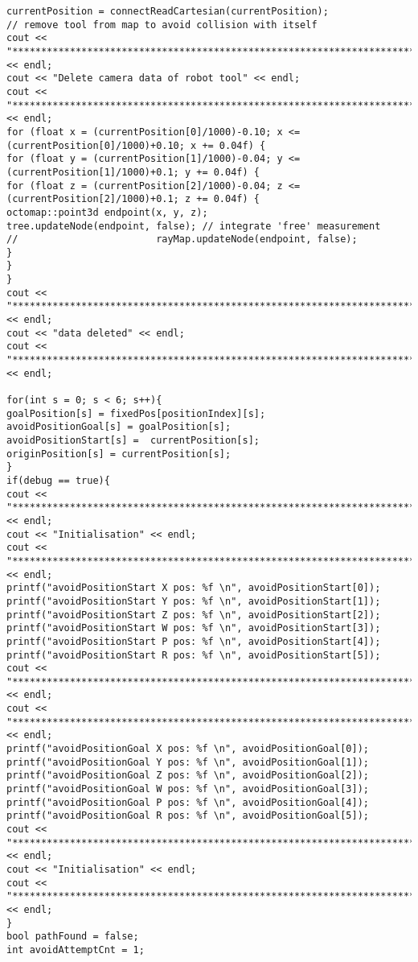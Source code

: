 \begin{lstlisting}[frame = single, label={lst:cppread1}]
currentPosition = connectReadCartesian(currentPosition);
// remove tool from map to avoid collision with itself
cout << "***********************************************************************" << endl;
cout << "Delete camera data of robot tool" << endl;
cout << "***********************************************************************" << endl;
for (float x = (currentPosition[0]/1000)-0.10; x <= (currentPosition[0]/1000)+0.10; x += 0.04f) {
for (float y = (currentPosition[1]/1000)-0.04; y <= (currentPosition[1]/1000)+0.1; y += 0.04f) {
for (float z = (currentPosition[2]/1000)-0.04; z <= (currentPosition[2]/1000)+0.1; z += 0.04f) {
octomap::point3d endpoint(x, y, z);
tree.updateNode(endpoint, false); // integrate 'free' measurement
//                        rayMap.updateNode(endpoint, false);
}
}
}
cout << "***********************************************************************" << endl;
cout << "data deleted" << endl;
cout << "***********************************************************************" << endl;

for(int s = 0; s < 6; s++){
goalPosition[s] = fixedPos[positionIndex][s];
avoidPositionGoal[s] = goalPosition[s];
avoidPositionStart[s] =  currentPosition[s];
originPosition[s] = currentPosition[s];
}
if(debug == true){
cout << "***********************************************************************" << endl;
cout << "Initialisation" << endl;
cout << "***********************************************************************" << endl;
printf("avoidPositionStart X pos: %f \n", avoidPositionStart[0]);
printf("avoidPositionStart Y pos: %f \n", avoidPositionStart[1]);
printf("avoidPositionStart Z pos: %f \n", avoidPositionStart[2]);
printf("avoidPositionStart W pos: %f \n", avoidPositionStart[3]);
printf("avoidPositionStart P pos: %f \n", avoidPositionStart[4]);
printf("avoidPositionStart R pos: %f \n", avoidPositionStart[5]);
cout << "***********************************************************************" << endl;
cout << "***********************************************************************" << endl;
printf("avoidPositionGoal X pos: %f \n", avoidPositionGoal[0]);
printf("avoidPositionGoal Y pos: %f \n", avoidPositionGoal[1]);
printf("avoidPositionGoal Z pos: %f \n", avoidPositionGoal[2]);
printf("avoidPositionGoal W pos: %f \n", avoidPositionGoal[3]);
printf("avoidPositionGoal P pos: %f \n", avoidPositionGoal[4]);
printf("avoidPositionGoal R pos: %f \n", avoidPositionGoal[5]);
cout << "***********************************************************************" << endl;
cout << "Initialisation" << endl;
cout << "***********************************************************************" << endl;
}
bool pathFound = false;
int avoidAttemptCnt = 1;


\end{lstlisting}
